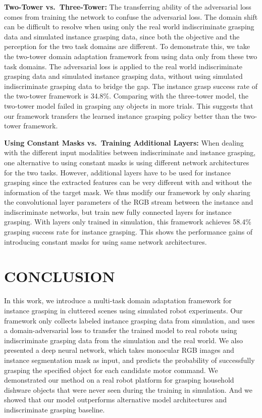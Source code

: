 \documentclass[letterpaper, 10 pt, conference]{ieeeconf}  %
\begin{document}
\textbf{Two-Tower vs.\ Three-Tower:} The transferring ability of the adversarial loss comes from training the network to confuse the adversarial loss. The domain shift can be difficult to resolve when using only the real world indiscriminate grasping data and simulated instance grasping data, since both the objective and the perception for the two task domains are different. To demonstrate this, we take the two-tower domain adaptation framework from \cite{ganin2016domain} using data only from these two task domains. The adversarial loss is applied to the real world indiscriminate grasping data and simulated instance grasping data, without using simulated indiscriminate grasping data to bridge the gap. The instance grasp success rate of the two-tower framework is 34.8\%. Comparing with the three-tower model, the two-tower model failed in grasping any objects in more trials. This suggests that our framework transfers the learned instance grasping policy better than the two-tower framework.  

\textbf{Using Constant Masks vs.\ Training Additional Layers:} 
When dealing with the different input modalities between indiscriminate and instance grasping, one alternative to using constant masks is using different network architectures for the two tasks. However, additional layers have to be used for instance grasping since the extracted features can be very different with and without the information of the target mask. We thus modify our framework by only sharing the convolutional layer parameters of the RGB stream between the instance and indiscriminate networks, but train new fully connected layers for instance grasping. With layers only trained in simulation, this framework achieves 58.4\% grasping success rate for instance grasping. This shows the performance gains of introducing constant masks for using same network architectures.

\section{CONCLUSION}%

In this work, we introduce a multi-task domain adaptation framework for instance grasping in cluttered scenes using simulated robot experiments. Our framework only collects labeled instance grasping data from simulation, and uses a domain-adversarial loss to transfer the trained model to real robots using indiscriminate grasping data from the simulation and the real world. We also presented a deep neural network, which takes monocular RGB images and instance segmentation mask as input, and predicts the probability of successfully grasping the specified object for each candidate motor command. We demonstrated our method on a real robot platform for grasping household dishware objects that were never seen during the training in simulation. And we showed that our model outperforms alternative model architectures and indiscriminate grasping baseline. 
\end{document}
